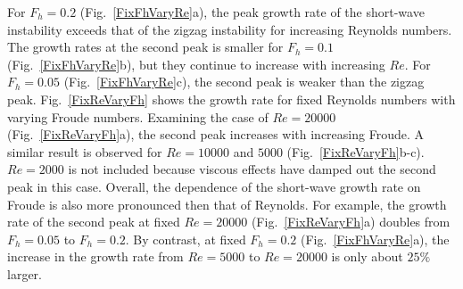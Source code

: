 For $F_{h}=0.2$ (Fig.~\ref{FixFhVaryRe}a), the peak growth rate of the short-wave instability exceeds that of the zigzag instability for increasing Reynolds numbers. The growth rates at the second peak is smaller for $F_{h}=0.1$ (Fig.~\ref{FixFhVaryRe}b), but they continue to increase with increasing $Re$. For $F_{h}=0.05$ (Fig.~\ref{FixFhVaryRe}c), the second peak is weaker than the zigzag peak. Fig.~\ref{FixReVaryFh} shows the growth rate for fixed Reynolds numbers with varying Froude numbers. Examining the case of $Re=20000$ (Fig.~\ref{FixReVaryFh}a), the second peak increases with increasing Froude. A similar result is observed for $Re=10000$ and $5000$ (Fig.~\ref{FixReVaryFh}b-c). $Re=2000$ is not included because viscous effects have damped out the second peak in this case. Overall, the dependence of the short-wave growth rate on Froude is also more pronounced then that of Reynolds. For example, the growth rate of the second peak at fixed $Re=20000$ (Fig.~\ref{FixReVaryFh}a) doubles from $F_{h}=0.05$ to $F_{h}=0.2$. By contrast, at fixed $F_{h}=0.2$ (Fig.~\ref{FixFhVaryRe}a), the increase in the growth rate from $Re=5000$ to $Re=20000$ is only about $25\%$ larger. 


